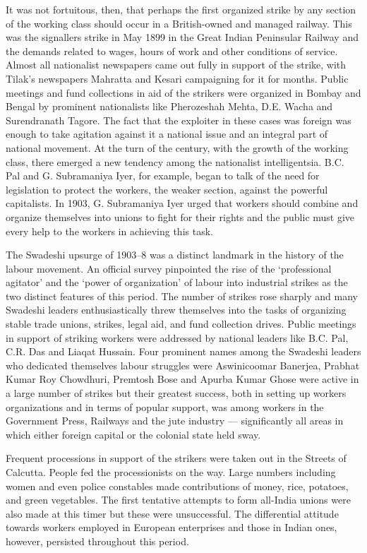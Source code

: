\begin{multicols}{2}
It was not fortuitous, then, that perhaps the first organized strike by any section of the working class should occur in a British-owned and managed railway. This was the signallers strike in May 1899 in the Great Indian Peninsular Railway and the demands related to wages, hours of work and other conditions of service. Almost all nationalist newspapers came out fully in support of the strike, with Tilak's newspapers Mahratta and Kesari campaigning for it for months. Public meetings and fund collections in aid of the strikers were organized in Bombay and Bengal by prominent nationalists like Pherozeshah Mehta, D.E. Wacha and Surendranath Tagore. The fact that the exploiter in these cases was foreign was enough to take agitation against it a national issue and an integral part of national movement. At the turn of the century, with the growth of the working class, there emerged a new tendency among the nationalist intelligentsia. B.C. Pal and G. Subramaniya Iyer, for example, began to talk of the need for legislation to protect the workers, the weaker section, against the powerful capitalists. In 1903, G. Subramaniya Iyer urged that workers should combine and organize themselves into unions to fight for their rights and the public must give every help to the workers in achieving this task.

The Swadeshi upsurge of 1903--8 was a distinct landmark in the history of the labour movement. An official survey pinpointed the rise of the `professional agitator' and the `power of organization' of labour into industrial strikes as the two distinct features of this period. The number of strikes rose sharply and many Swadeshi leaders enthusiastically threw themselves into the tasks of organizing stable trade unions, strikes, legal aid, and fund collection drives. Public meetings in support of striking workers were addressed by national leaders like B.C. Pal, C.R. Das and Liaqat Hussain. Four prominent names among the Swadeshi leaders who dedicated themselves labour struggles were Aswinicoomar Banerjea, Prabhat Kumar Roy Chowdhuri, Premtosh Bose and Apurba Kumar Ghose were active in a large number of strikes but their greatest success, both in setting up workers organizations and in terms of popular support, was among workers in the Government Press, Railways and the jute industry --- significantly all areas in which either foreign capital or the colonial state held sway.

Frequent processions in support of the strikers were taken out in the Streets of Calcutta. People fed the processionists on the way. Large numbers including women and even police constables made contributions of money, rice, potatoes, and green vegetables. The first tentative attempts to form all-India unions were also made at this timer but these were unsuccessful. The differential attitude towards workers employed in European enterprises and those in Indian ones, however, persisted throughout this period.


\end{multicols}
